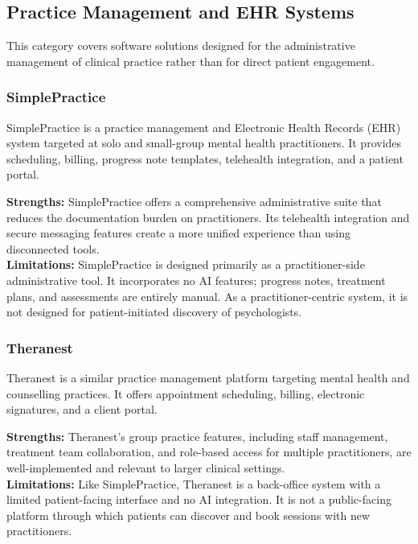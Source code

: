 \subsection{Practice Management and EHR Systems}
\label{subsec:ehr}

This category covers software solutions designed for the administrative
management of clinical practice rather than for direct patient engagement.

\subsubsection{SimplePractice}

SimplePractice is a practice management and Electronic Health Records (EHR)
system targeted at solo and small-group mental health practitioners. It provides
scheduling, billing, progress note templates, telehealth integration, and a
patient portal.

\begin{tcolorbox}[colback=lightgray, colframe=accentblue, title=\textbf{SimplePractice — Assessment}, fonttitle=\bfseries, sharp corners=south]
  \textbf{Strengths:} SimplePractice offers a comprehensive administrative suite
  that reduces the documentation burden on practitioners. Its telehealth
  integration and secure messaging features create a more unified experience than
  using disconnected tools. \\[4pt]
  \textbf{Limitations:} SimplePractice is designed primarily as a
  practitioner-side administrative tool. It incorporates no AI features; progress
  notes, treatment plans, and assessments are entirely manual. As a
  practitioner-centric system, it is not designed for patient-initiated discovery
  of psychologists.
\end{tcolorbox}

\subsubsection{Theranest}

Theranest is a similar practice management platform targeting mental health and
counselling practices. It offers appointment scheduling, billing, electronic
signatures, and a client portal.

\begin{tcolorbox}[colback=lightgray, colframe=accentblue, title=\textbf{Theranest — Assessment}, fonttitle=\bfseries, sharp corners=south]
  \textbf{Strengths:} Theranest's group practice features, including staff
  management, treatment team collaboration, and role-based access for multiple
  practitioners, are well-implemented and relevant to larger clinical settings.
  \\[4pt]
  \textbf{Limitations:} Like SimplePractice, Theranest is a back-office system
  with a limited patient-facing interface and no AI integration. It is not a
  public-facing platform through which patients can discover and book sessions
  with new practitioners.
\end{tcolorbox}

